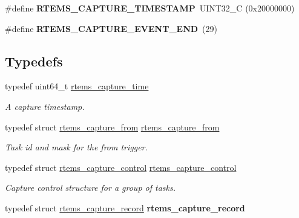 \begin{DoxyCompactItemize}
\item 
\mbox{\label{group__libmisc__capture_ga79c418c6d273265224342bc7314e441e}} 
\#define {\bfseries R\+T\+E\+M\+S\+\_\+\+C\+A\+P\+T\+U\+R\+E\+\_\+\+T\+I\+M\+E\+S\+T\+A\+MP}~U\+I\+N\+T32\+\_\+C (0x20000000)
\item 
\mbox{\label{group__libmisc__capture_gad1b334a9c20097ef9d6d21414e1352a9}} 
\#define {\bfseries R\+T\+E\+M\+S\+\_\+\+C\+A\+P\+T\+U\+R\+E\+\_\+\+E\+V\+E\+N\+T\+\_\+\+E\+ND}~(29)
\end{DoxyCompactItemize}
\subsection*{Typedefs}
\begin{DoxyCompactItemize}
\item 
typedef uint64\+\_\+t \mbox{\hyperlink{group__libmisc__capture_gaf4cab587ea286bb2352fcfab9c223560}{rtems\+\_\+capture\+\_\+time}}
\begin{DoxyCompactList}\small\item\em A capture timestamp. \end{DoxyCompactList}\item 
typedef struct \mbox{\hyperlink{structrtems__capture__from}{rtems\+\_\+capture\+\_\+from}} \mbox{\hyperlink{group__libmisc__capture_gabb9613c506ffe34885dccb4346fce2dc}{rtems\+\_\+capture\+\_\+from}}
\begin{DoxyCompactList}\small\item\em Task id and mask for the from trigger. \end{DoxyCompactList}\item 
typedef struct \mbox{\hyperlink{structrtems__capture__control}{rtems\+\_\+capture\+\_\+control}} \mbox{\hyperlink{group__libmisc__capture_ga8c06930c1e62210f9bd0e967bda31ff5}{rtems\+\_\+capture\+\_\+control}}
\begin{DoxyCompactList}\small\item\em Capture control structure for a group of tasks. \end{DoxyCompactList}\item 
\mbox{\label{group__libmisc__capture_ga166662a6b5d9c70983a595661cbe9025}} 
typedef struct \mbox{\hyperlink{structrtems__capture__record}{rtems\+\_\+capture\+\_\+record}} {\bfseries rtems\+\_\+capture\+\_\+record}
\item 

\end{DoxyCompactItemize}
